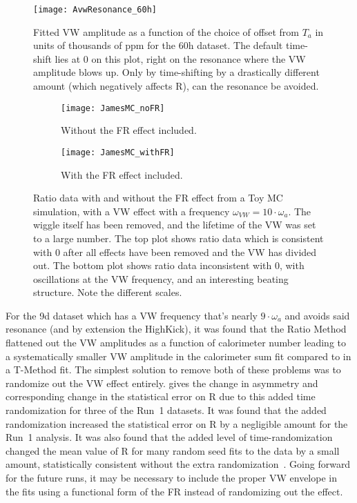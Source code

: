 \begin{figure}
    \centering
    \texttt{[image: AvwResonance\_60h]}
    \caption[VW amplitude resonance in the 60h dataset]{Fitted VW amplitude as a function of the choice of  offset from $T_{a}$ in units of thousands of ppm for the 60h dataset. The default time-shift lies at 0 on this plot, right on the resonance where the VW amplitude blows up. Only by time-shifting by a drastically different amount (which negatively affects R), can the resonance be avoided.}
    \label{fig:VWresonance}
\end{figure}


\begin{figure}
\centering
    \begin{subfigure}[t]{0.6\textwidth}
        \centering
        \texttt{[image: JamesMC\_noFR]}
        \caption{Without the FR effect included.}
    \end{subfigure}%

    \begin{subfigure}[t]{0.6\textwidth}
        \centering
        \texttt{[image: JamesMC\_withFR]}
        \caption{With the FR effect included.}
    \end{subfigure}
\caption[VW envelope in Ratio Method Toy MC data with and without FR effect]{Ratio data with and without the FR effect from a Toy MC simulation, with a VW effect with a frequency $\omega_{VW} = 10 \cdot \omega_{a}$. The \wa wiggle itself has been removed, and the lifetime of the VW was set to a large number. The top plot shows ratio data which is consistent with 0 after all effects have been removed and the VW has divided out. The bottom plot shows ratio data inconsistent with 0, with oscillations at the VW frequency, and an interesting beating structure. Note the different scales.}
\label{fig:JamesMC_VW_FR}
\end{figure}


For the 9d dataset which has a VW frequency that's nearly $9 \cdot \omega_{a}$ and avoids said resonance (and by extension the HighKick), it was found that the Ratio Method flattened out the VW amplitudes as a function of calorimeter number leading to a systematically smaller VW amplitude in the calorimeter sum fit compared to in a T-Method fit. The simplest solution to remove both of these problems was to randomize out the VW effect entirely.  gives the change in asymmetry and corresponding change in the statistical error on R due to this added time randomization for three of the Run~1 datasets. It was found that the added randomization increased the statistical error on R by a negligible amount for the Run~1 analysis. It was also found that the added level of time-randomization changed the mean value of R for many random seed fits to the data by a small amount, statistically consistent without the extra randomization~\cite{VWinRatio}. Going forward for the future runs, it may be necessary to include the proper VW envelope in the fits using a functional form of the FR instead of randomizing out the effect.


